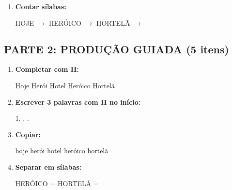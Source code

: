 \begin{exercicio}
\begin{enumerate}
  \item \textbf{Contar sílabas:}
  \begin{center}
  HOJE $\rightarrow$ \underline{\hspace{1cm}} \quad HERÓICO $\rightarrow$ \underline{\hspace{1cm}} \quad HORTELÃ $\rightarrow$ \underline{\hspace{1cm}}
  \end{center}
\end{enumerate}

\subsection*{PARTE 2: PRODUÇÃO GUIADA (5 itens)}

\begin{enumerate}[resume]
  \item \textbf{Completar com H:}
  \begin{center}
  \underline{H}oje \quad \underline{H}erói \quad \underline{H}otel \quad \underline{H}eróico \quad \underline{H}ortelã
  \end{center}

  \item \textbf{Escrever 3 palavras com H no início:}
  \begin{center}
  1. \underline{\hspace{3cm}} . \underline{\hspace{3cm}} . \underline{\hspace{3cm}}
  \end{center}

  \item \textbf{Copiar:}
  \begin{center}
  hoje \quad herói \quad hotel \quad heróico \quad hortelã
  \end{center}

  \item \textbf{Separar em sílabas:}
  \begin{center}
  HERÓICO = \underline{\hspace{1cm}} \underline{\hspace{1cm}} \underline{\hspace{1cm}} \underline{\hspace{1cm}} \quad HORTELÃ = \underline{\hspace{1cm}} \underline{\hspace{1cm}} \underline{\hspace{1cm}}
  \end{center}


\end{enumerate}
\end{exercicio}
